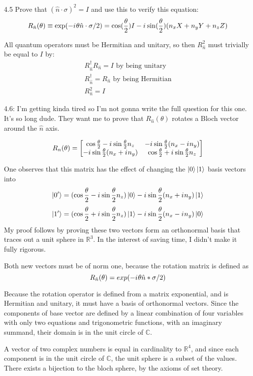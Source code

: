 \documentclass[12pt, letterpaper, twoside]{article}
\newcommand{\iu}{{i\mkern1mu}}
\newcommand{\halftheta}{\frac{\theta}{2}}
\newcommand{\twoXtwo}[4]{\begin{bmatrix}
    #1 & #3 \\
    #2 & #4
\end{bmatrix}}
\newcommand{\Rn}{\twoXtwo{
    \cos{\halftheta} - \iu \sin{\halftheta}n_z
    }{
        -\iu \sin{\halftheta}(n_x + \iu n_y)
    }{
        -\iu \sin{\halftheta}(n_x - \iu n_y)
    }{
        \cos{\halftheta} + \iu \sin{\halftheta}n_z
        }}
\begin{document}
4.5 Prove that $(\hat{n} \cdot \sigma)^2 = I$ and use this to verify this equation:
$$
	R_{\hat{n}}(\theta) \equiv \exp(-\iu \theta \hat{n} \cdot \sigma/2) = \cos(\frac{\theta}{2})I - \iu \sin(\frac{\theta}{2})(n_xX + n_yY + n_zZ)
$$

All quantum operators must be Hermitian and unitary, so then $R_{\hat{n}}^2$ must trivially be equal to $I$ by:
\begin{subequations}
	\begin{align}
R_{\hat{n}}^\dagger R_{\hat{n}} = I \text{ by being unitary} \\
R_{\hat{n}}^\dagger = R_{\hat{n}} \text{ by being Hermitian} \\
R_{\hat{n}}^2 = I
\end{align}
\end{subequations}

4.6: I'm getting kinda tired so I'm not gonna write the full question for this one. It's so long dude. They want me to prove that $R_{\hat{n}}(\theta)$ rotates a Bloch vector around the $\hat{n}$ axis.

$$
R_n(\theta) = \Rn
$$

One observes that this matrix has the effect of changing the $\ket{0}\ket{1}$ basis vectors into
$$
\ket{0'} = (\cos{\halftheta} - \iu \sin{\halftheta}n_z)\ket{0} - \iu\sin{\halftheta}(n_x + \iu n_y) \ket{1}
$$
$$
\ket{1'} = (\cos{\halftheta} + \iu \sin{\halftheta}n_z)\ket{1} -  \iu\sin{\halftheta}(n_x - \iu n_y) \ket{0}
$$
My proof follows by proving these two vectors form an orthonormal basis that traces out a unit sphere in $\mathbb{R}^3$. In the interest of saving time, I didn't make it fully rigorous.

Both new vectors must be of norm one, because the rotation matrix is defined as
$$
R_{\hat{n}}(\theta) = exp(-\iu \theta \hat{n} * \sigma/2)
$$

Because the rotation operator is defined from a matrix exponential, and is Hermitian and unitary, it must have a basis of orthonormal vectors. Since the components of base vector are defined by a linear combination of four variables with only two equations and trigonometric functions, with an imaginary summand, their domain is in the unit circle of $\mathbb{C}$.

A vector of two complex numbers is equal in cardinality to $\mathbb{R}^4$, and since each component is in the unit circle of $\mathbb{C}$, the unit sphere is a subset of the values. There exists a bijection to the bloch sphere, by the axioms of set theory.
\end{document}
